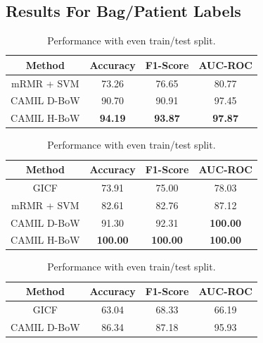 

\subsection{Results For Bag/Patient Labels}

\begin{table}[t]
\begin{center} 
\begin{minipage}{0.4\textwidth}
\caption{Performance on training set.}
\label{tab:train-comp}
\begin{tabular}{|c|ccc|}\hline
Method & Accuracy & F1-Score & AUC-ROC\\\hline
mRMR + SVM & 73.26 & 76.65 & 80.77\\\hline 
CAMIL D-BoW & 90.70 & 90.91 & 97.45\\\hline
CAMIL H-BoW & \bf{94.19} & \bf{93.87} & \bf{97.87}\\\hline
\end{tabular}
\end{minipage}
\begin{minipage}{0.4\textwidth}
\caption{Performance with 23 patient test set.} 
\label{tab:test-comp}
\begin{tabular}{|c|ccc|}\hline
Method & Accuracy & F1-Score & AUC-ROC\\\hline
GICF & 73.91 & 75.00 & 78.03\\\hline
mRMR + SVM & 82.61 & 82.76 & 87.12\\\hline 
CAMIL D-BoW & 91.30 & 92.31 & \bf{100.00}\\\hline
CAMIL H-BoW & \bf{100.00} & \bf{100.00} & \bf{100.00}\\\hline
\end{tabular}
\bigskip
\end{minipage}
\begin{minipage}{0.4\textwidth}
\caption{Performance with even train/test split.} 
\label{tab:even-comp}
\begin{tabular}{|c|ccc|}\hline
Method & Accuracy & F1-Score & AUC-ROC\\\hline
GICF & 63.04 & 68.33 & 66.19\\\hline %
CAMIL D-BoW & 86.34 & 87.18 & 95.93\\\hline

\end{tabular}
\end{minipage}
\end{center}
\end{table}
